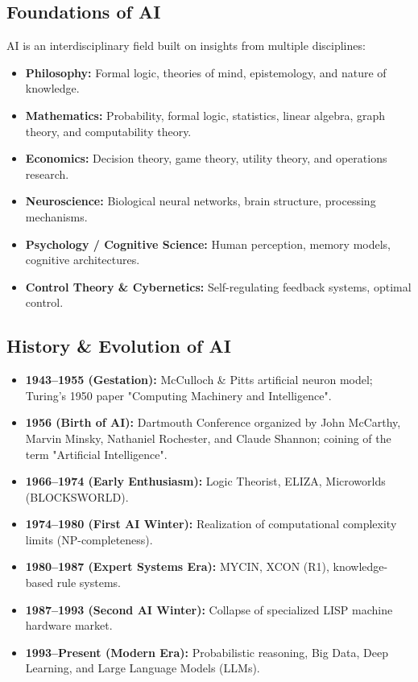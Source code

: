 \documentclass[12pt,a4paper]{article}
\begin{document}
\subsection{Foundations of AI}
AI is an interdisciplinary field built on insights from multiple disciplines:
\begin{itemize}[leftmargin=*, itemsep=3pt]
  \item \textbf{Philosophy:} Formal logic, theories of mind, epistemology, and nature of knowledge.
  \item \textbf{Mathematics:} Probability, formal logic, statistics, linear algebra, graph theory, and computability theory.
  \item \textbf{Economics:} Decision theory, game theory, utility theory, and operations research.
  \item \textbf{Neuroscience:} Biological neural networks, brain structure, processing mechanisms.
  \item \textbf{Psychology / Cognitive Science:} Human perception, memory models, cognitive architectures.
  \item \textbf{Control Theory \& Cybernetics:} Self-regulating feedback systems, optimal control.
\end{itemize}

\subsection{History \& Evolution of AI}
\begin{itemize}[leftmargin=*, itemsep=3pt]
  \item \textbf{1943--1955 (Gestation):} McCulloch \& Pitts artificial neuron model; Turing's 1950 paper "Computing Machinery and Intelligence".
  \item \textbf{1956 (Birth of AI):} Dartmouth Conference organized by John McCarthy, Marvin Minsky, Nathaniel Rochester, and Claude Shannon; coining of the term "Artificial Intelligence".
  \item \textbf{1966--1974 (Early Enthusiasm):} Logic Theorist, ELIZA, Microworlds (BLOCKSWORLD).
  \item \textbf{1974--1980 (First AI Winter):} Realization of computational complexity limits (NP-completeness).
  \item \textbf{1980--1987 (Expert Systems Era):} MYCIN, XCON (R1), knowledge-based rule systems.
  \item \textbf{1987--1993 (Second AI Winter):} Collapse of specialized LISP machine hardware market.
  \item \textbf{1993--Present (Modern Era):} Probabilistic reasoning, Big Data, Deep Learning, and Large Language Models (LLMs).
\end{itemize}
\end{document}
